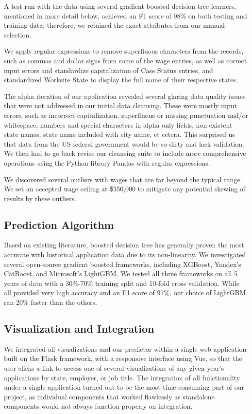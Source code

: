\documentclass[sigconf]{acmart}
\begin{document}
A test run with the data using several gradient boosted decision tree learners, 
mentioned in more detail below, achieved an F1 score of 98\% on both testing 
and training data; therefore, we retained the exact attributes from our manual selection. 


We apply regular expressions to remove superfluous characters from the records, 
such as commas and dollar signs from some of the wage entries, 
as well as correct input errors and standardize capitalization of Case Status entries, 
and standardized Worksite State to display the full name of their respective states.  


The alpha iteration of our application revealed several glaring data quality issues that were not addressed in our initial 
data cleansing. These were mostly input errors, such as incorrect capitalization, 
superfluous or missing punctuation and/or whitespace, 
numbers and special characters in alpha only fields, 
non-existent state names, state name included with city name, et cetera. 
This surprised us that data from the US federal government would be so dirty and lack validation. 
We then had to go back revise our cleansing suite to include more comprehensive operations using the 
Python library Pandas with regular expressions. 



We discovered several outliers with wages that are far beyond the typical range. 
We set an accepted wage ceiling at \$350,000 to mitigate any potential skewing of results 
by these outliers. 


\subsection{Prediction Algorithm}
Based on existing literature, boosted decision tree has generally proven 
the most accurate with historical application data due to its non-linearity. 
We investigated several open-source gradient boosted frameworks, including XGBoost, 
Yandex’s CatBoost, and Microsoft’s LightGBM. We tested all three frameworks on 
all 5 years of data with a 30\%-70\% training split and 10-fold cross validation. 
While all provided very high accuracy and an F1 score of 97\%, our choice of LightGBM ran 20\% faster than the others. 


\subsection{Visualization and Integration}
We integrated all visualizations and our predictor within a single 
web application built on the Flask framework, with a responsive interface using Vue, so that 
the user clicks a link to access one of several visualizations of any given year's applications 
by state, employer, or job title. The integration of all functionality under a single application 
turned out to be the most time-consuming part of our project, as individual components that worked 
flawlessly as standalone components would not always function properly on integration. 
\end{document}

